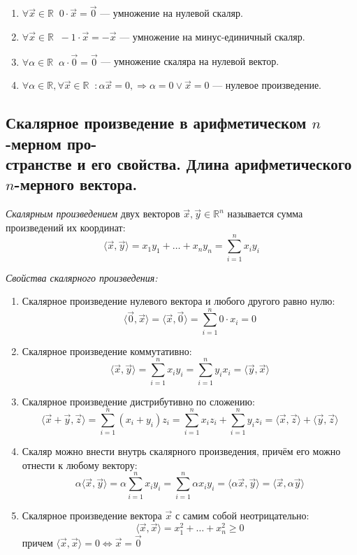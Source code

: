 \documentclass[a4paper, 12pt]{article}
\newcommand{\bbR}[0]{\mathbb{R}}
\begin{document}
\begin{enumerate}
\item $\forall \vec{x} \in \mathbb{R}\;\;  0 \cdot \vec{x} = \vec0$ --- умножение на нулевой скаляр.

\item  $\forall \vec{x} \in \mathbb{R}\;\; -1 \cdot \vec{x} = -\vec{x}$ --- умножение на минус-единичный скаляр.

\item $\forall \alpha \in \mathbb{R}\;\; \alpha \cdot \vec{0} = \vec{0}$ --- умножение скаляра на нулевой вектор.

\item $\forall \alpha \in \mathbb{R}, \forall \vec{x} \in \mathbb{R}\;\; : \alpha \vec{x} = 0, \Rightarrow \alpha = 0 \vee \vec{x} = 0$ --- нулевое произведение.
\end{enumerate}


\subsection{Скалярное произведение в арифметическом $n$-мерном про-\\странстве и его свойства. Длина арифметического $n$-мерного вектора.}
\textit{Скалярным произведением} двух векторов $\vec{x}, \vec{y} \in \bbR^n$ называется сумма произведений их координат:
\[\langle\vec{x}, \vec{y}\rangle = x_1y_1 + \ldots + x_ny_n = \sum_{i = 1}^{n} x_{i}y_{i}\]

\textit{Свойства скалярного произведения:}
\begin{enumerate}
\item Скалярное произведение нулевого вектора и любого другого равно нулю: \[\langle\vec{0}, \vec{x}\rangle = \langle\vec{x}, \vec{0}\rangle = \sum_{i = 1}^{n} 0 \cdot x_i = 0\]

\item Скалярное произведение коммутативно: \[\langle\vec{x}, \vec{y}\rangle = \sum_{i = 1}^{n} x_i y_i = \sum_{i = 1}^{n} y_i x_i = \langle\vec{y}, \vec{x}\rangle\]

\item Скалярное произведение дистрибутивно по сложению: \[\langle\vec{x} + \vec{y}, \vec{z}\rangle = \sum_{i = 1}^{n} (x_i + y_i) z_i = \sum_{i = 1}^{n} x_i z_i + \sum_{i = 1}^{n} y_i z_i = \langle\vec{x}, \vec{z}\rangle + \langle\vec{y}, \vec{z}\rangle\]

\item Скаляр можно внести внутрь скалярного произведения, причём его можно отнести к любому вектору:\[\alpha \langle\vec{x}, \vec{y}\rangle = \alpha \sum_{i = 1}^{n} x_i y_i = \sum_{i = 1}^{n} \alpha x_i y_i = \langle \alpha \vec{x}, \vec{y}\rangle = \langle\vec{x}, \alpha \vec{y}\rangle\]

\item Скалярное произведение вектора $\vec{x}$ с самим собой неотрицательно: \[\langle \vec{x}, \vec{x} \rangle = x_1^2 + \ldots + x_n^2 \geqslant 0\] причем $\langle\vec{x}, \vec{x}\rangle =  0 \iff \vec{x} = \vec{0}$
\end{enumerate}
\end{document}
